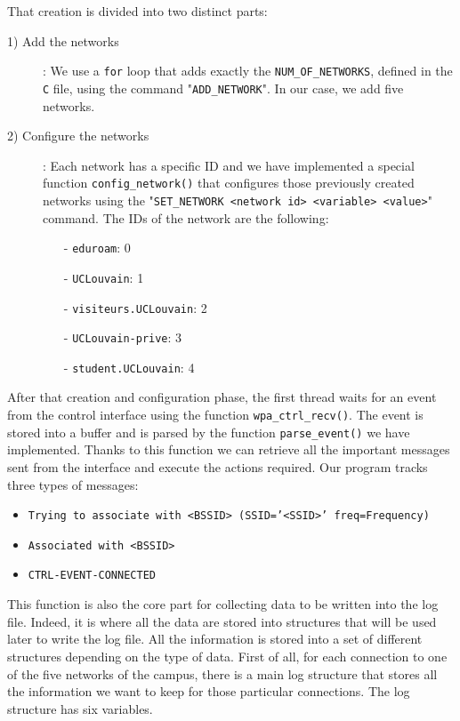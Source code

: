 That creation is divided into two distinct parts:
\begin{description}
	\item [1) Add the networks]: We use a \texttt{for} loop that adds exactly the \texttt{NUM\_OF\_NETWORKS}, defined in the \texttt{C} file, using the command "\texttt{ADD\_NETWORK}". In our case, we add five networks.
	\item [2) Configure the networks]: Each network has a specific ID and we have implemented a special function \texttt{config\_network()} that configures those previously created networks using the "\texttt{SET\_NETWORK <network id> <variable> <value>}" command. The IDs of the network are the following:
		\begin{itemize}
			\item [-] \texttt{eduroam}: 0
			\item [-] \texttt{UCLouvain}: 1
			\item [-] \texttt{visiteurs.UCLouvain}: 2
			\item [-] \texttt{UCLouvain-prive}: 3
			\item [-] \texttt{student.UCLouvain}: 4
		\end{itemize}
\end{description}

After that creation and configuration phase, the first thread waits for an event from the control interface using the function \texttt{wpa\_ctrl\_recv()}. The event is stored into a buffer and is parsed by the function \texttt{parse\_event()} we have implemented. Thanks to this function we can retrieve all the important messages sent from the interface and execute the actions required. Our program tracks three types of messages:
\begin{itemize}
	\item \texttt{Trying to associate with <BSSID> (SSID='<SSID>' freq=Frequency)}
	\item \texttt{Associated with <BSSID>}
	\item \texttt{CTRL-EVENT-CONNECTED}
\end{itemize}

This function is also the core part for collecting data to be written into the log file. Indeed, it is where all the data are stored into structures that will be used later to write the log file. All the information is stored into a set of different structures depending on the type of data. First of all, for each connection to one of the five networks of the campus, there is a main log structure that stores all the information we want to keep for those particular connections. The log structure has six variables.\\

